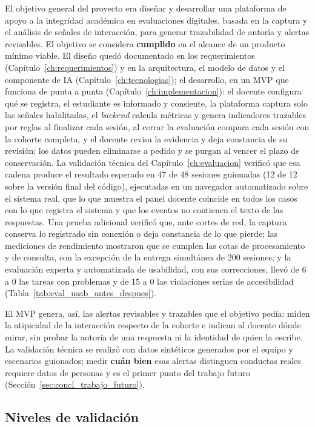 El objetivo general del proyecto era diseñar y desarrollar una plataforma de apoyo a la integridad académica en evaluaciones digitales, basada en la captura y el análisis de señales de interacción, para generar trazabilidad de autoría y alertas revisables. El objetivo se considera \textbf{cumplido} en el alcance de un producto mínimo viable. El diseño quedó documentado en los requerimientos (Capítulo~\ref{ch:requerimientos}) y en la arquitectura, el modelo de datos y el componente de IA (Capítulo~\ref{ch:tecnologias}); el desarrollo, en un MVP que funciona de punta a punta (Capítulo~\ref{ch:implementacion}): el docente configura qué se registra, el estudiante es informado y consiente, la plataforma captura solo las señales habilitadas, el \textit{backend} calcula métricas y genera indicadores trazables por reglas al finalizar cada sesión, al cerrar la evaluación compara cada sesión con la cohorte completa, y el docente revisa la evidencia y deja constancia de su revisión; los datos pueden eliminarse a pedido y se purgan al vencer el plazo de conservación. La validación técnica del Capítulo~\ref{ch:evaluacion} verificó que esa cadena produce el resultado esperado en 47 de 48 sesiones guionadas (12 de 12 sobre la versión final del código), ejecutadas en un navegador automatizado sobre el sistema real, que lo que muestra el panel docente coincide en todos los casos con lo que registra el sistema y que los eventos no contienen el texto de las respuestas. Una prueba adicional verificó que, ante cortes de red, la captura conserva lo registrado sin conexión o deja constancia de lo que pierde; las mediciones de rendimiento mostraron que se cumplen las cotas de procesamiento y de consulta, con la excepción de la entrega simultánea de 200 sesiones; y la evaluación experta y automatizada de usabilidad, con sus correcciones, llevó de 6 a 0 las tareas con problemas y de 15 a 0 las violaciones serias de accesibilidad (Tabla~\ref{tab:eval_usab_antes_despues}).

El MVP genera, así, las alertas revisables y trazables que el objetivo pedía: miden la atipicidad de la interacción respecto de la cohorte e indican al docente dónde mirar, sin probar la autoría de una respuesta ni la identidad de quien la escribe. La validación técnica se realizó con datos sintéticos generados por el equipo y escenarios guionados; medir \textbf{cuán bien} esas alertas distinguen conductas reales requiere datos de personas y es el primer punto del trabajo futuro (Sección~\ref{sec:concl_trabajo_futuro}).

\subsection{Niveles de validación}
\label{sec:concl_niveles}

